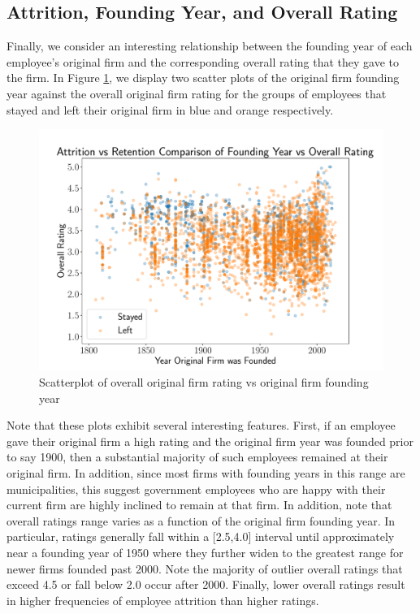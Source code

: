 \documentclass[10pt]{article}
\begin{document}
\subsection{Attrition, Founding Year, and Overall Rating}
Finally, we consider an interesting relationship between the founding year 
of each employee's original firm and the corresponding overall rating that 
they gave to the firm.  In Figure \ref{fig:attmod}, we display two scatter 
plots of the original firm founding year against the overall original firm rating 
for the groups of employees that stayed and left their original firm in blue and 
orange respectively. 
%
\begin{figure}[thb]
    \centering
	\includegraphics[width=1.0\linewidth]{attrat.pdf}
	\caption{Scatterplot of overall original firm rating vs original firm founding year}
	\label{fig:attmod}
\end{figure}
%
Note that these plots exhibit several interesting features.  First, if an employee gave 
their original firm a high rating and the original firm year was founded prior to 
say 1900, then a substantial majority of such employees remained at their original 
firm.  In addition, since most firms with founding years in this range are municipalities, 
this suggest government employees who are happy with their current firm are highly inclined 
to remain at that firm.  In addition, note that overall ratings range varies as a function 
of the original firm founding year.  In particular, ratings generally fall within 
a [2.5,4.0] interval until approximately near a founding year of 1950 where they further 
widen to the greatest range for newer firms founded past 2000.  Note the majority of 
outlier overall ratings that exceed 4.5 or fall below 2.0 occur after 2000.  Finally, 
lower overall ratings result in higher frequencies of employee attrition than higher ratings.
\end{document}
